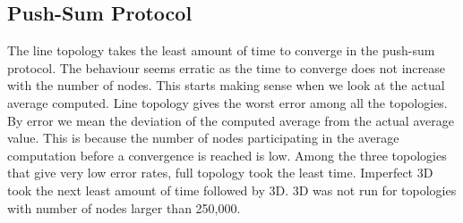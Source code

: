 \documentclass[11pt]{article}
\begin{document}
\subsection{Push-Sum Protocol}
The line topology takes the least amount of time to converge in the push-sum protocol. The behaviour seems erratic as the time to converge does not increase with the number of nodes. This starts making sense when we look at the actual average computed. Line topology gives the worst error among all the topologies. By error we mean the deviation of the computed average from the actual average value. This is because the number of nodes participating in the average computation before a convergence is reached is low. Among the three topologies that give very low error rates, full topology took the least time. Imperfect 3D took the next least amount of time followed by 3D. 3D was not run for topologies with number of nodes larger than 250,000.
\end{document}

